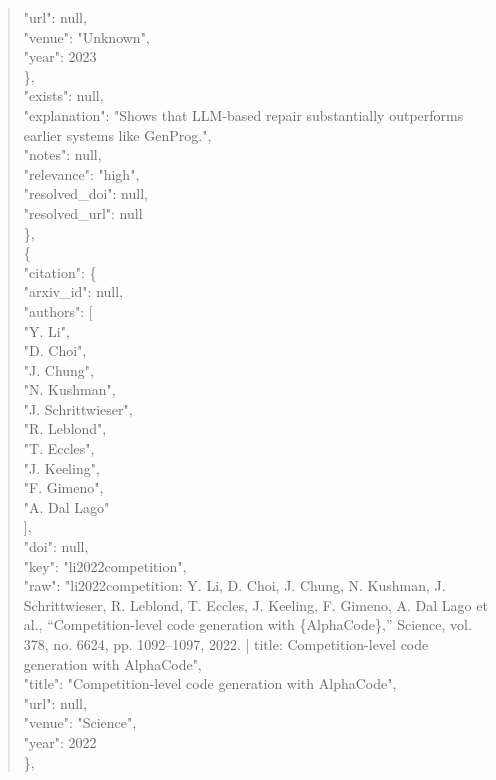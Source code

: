 \documentclass[11pt]{article}
\begin{document}
\begin{quote}
        "url": null,\\
        "venue": "Unknown",\\
        "year": 2023\\
      \},\\
      "exists": null,\\
      "explanation": "Shows that LLM-based repair substantially outperforms earlier systems like GenProg.",\\
      "notes": null,\\
      "relevance": "high",\\
      "resolved\_doi": null,\\
      "resolved\_url": null\\
    \},\\
    \{\\
      "citation": \{\\
        "arxiv\_id": null,\\
        "authors": [\\
          "Y. Li",\\
          "D. Choi",\\
          "J. Chung",\\
          "N. Kushman",\\
          "J. Schrittwieser",\\
          "R. Leblond",\\
          "T. Eccles",\\
          "J. Keeling",\\
          "F. Gimeno",\\
          "A. Dal Lago"\\
        ],\\
        "doi": null,\\
        "key": "li2022competition",\\
        "raw": "li2022competition: Y. Li, D. Choi, J. Chung, N. Kushman, J. Schrittwieser, R. Leblond, T. Eccles, J. Keeling, F. Gimeno, A. Dal Lago et al., ``Competition-level code generation with \{AlphaCode\},'' Science, vol. 378, no. 6624, pp. 1092--1097, 2022. | title: Competition-level code generation with AlphaCode",\\
        "title": "Competition-level code generation with AlphaCode",\\
        "url": null,\\
        "venue": "Science",\\
        "year": 2022\\
      \},\\

\end{quote}
\end{document}
